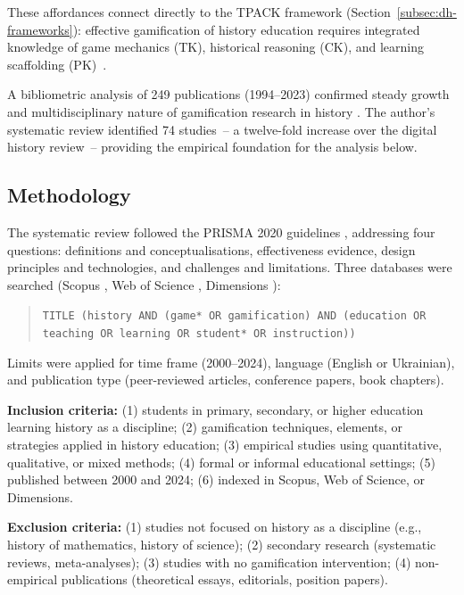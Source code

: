 \noindent These affordances connect directly to the TPACK framework (Section~\ref{subsec:dh-frameworks}): effective gamification of history education requires integrated knowledge of game mechanics (TK), historical reasoning (CK), and learning scaffolding (PK)~\cite{KorniienkoSemerikov2024}.

A bibliometric analysis of 249 publications (1994--2023) confirmed steady growth and multidisciplinary nature of gamification research in history \cite{Shen2025}. The author's systematic review \cite{KorniienkoSemerikov2024} identified 74 studies~-- a twelve-fold increase over the digital history review~-- providing the empirical foundation for the analysis below.

\subsection{Methodology}

The systematic review followed the PRISMA 2020 guidelines \citep{Page2021}, addressing four questions: definitions and conceptualisations, effectiveness evidence, design principles and technologies, and challenges and limitations. Three databases were searched (Scopus \cite{scopus}, Web of Science \cite{wos}, Dimensions \cite{dimensions}):

\begin{quote}
\texttt{TITLE (history AND (game* OR gamification) AND (education OR teaching OR learning OR student* OR instruction))}
\end{quote}

Limits were applied for time frame (2000--2024), language (English or Ukrainian), and publication type (peer-reviewed articles, conference papers, book chapters).

\textbf{Inclusion criteria:} (1) students in primary, secondary, or higher education learning history as a discipline; (2) gamification techniques, elements, or strategies applied in history education; (3) empirical studies using quantitative, qualitative, or mixed methods; (4) formal or informal educational settings; (5) published between 2000 and 2024; (6) indexed in Scopus, Web of Science, or Dimensions.

\textbf{Exclusion criteria:} (1) studies not focused on history as a discipline (e.g., history of mathematics, history of science); (2) secondary research (systematic reviews, meta-analyses); (3) studies with no gamification intervention; (4) non-empirical publications (theoretical essays, editorials, position papers).

